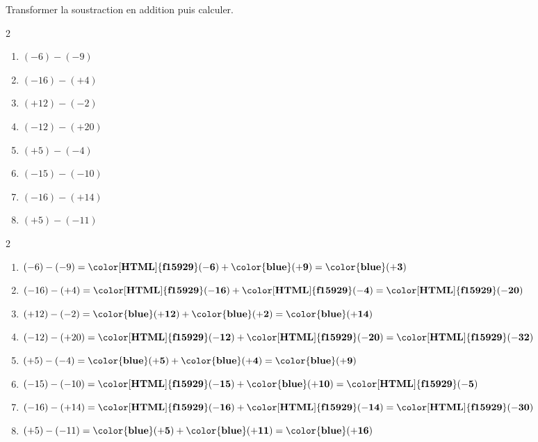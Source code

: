 \begin{exercice*}
    Transformer la soustraction en addition puis calculer.
    \begin{multicols}2
        \begin{enumerate}            
            \item $ (-6) - (-9) $
            \item $ (-16) - (+4) $
            \item $ (+12) - (-2) $
            \item $ (-12) - (+20) $
            \item $ (+5) - (-4) $
            \item $ (-15) - (-10) $
            \item $ (-16) - (+14) $
            \item $ (+5) - (-11) $
        \end{enumerate}
    \end{multicols}
\end{exercice*}
\begin{corrige}
    \phantom{rrr}    
    \begin{multicols}2
        \begin{enumerate}
            \item $ (-6) - (-9) = \mathbf{{\color[HTML]{f15929}(-6)}} + \mathbf{{\color{blue}(+9)}} = \mathbf{{\color{blue}(+3)}} $
            \item $ (-16) - (+4) = \mathbf{{\color[HTML]{f15929}(-16)}} + \mathbf{{\color[HTML]{f15929}(-4)}} = \mathbf{{\color[HTML]{f15929}(-20)}} $
            \item $ (+12) - (-2) = \mathbf{{\color{blue}(+12)}} + \mathbf{{\color{blue}(+2)}} = \mathbf{{\color{blue}(+14)}} $
            \item $ (-12) - (+20) = \mathbf{{\color[HTML]{f15929}(-12)}} + \mathbf{{\color[HTML]{f15929}(-20)}} = \mathbf{{\color[HTML]{f15929}(-32)}} $
            \item $ (+5) - (-4) = \mathbf{{\color{blue}(+5)}} + \mathbf{{\color{blue}(+4)}} = \mathbf{{\color{blue}(+9)}} $
            \item $ (-15) - (-10) = \mathbf{{\color[HTML]{f15929}(-15)}} + \mathbf{{\color{blue}(+10)}} = \mathbf{{\color[HTML]{f15929}(-5)}} $
            \item $ (-16) - (+14) = \mathbf{{\color[HTML]{f15929}(-16)}} + \mathbf{{\color[HTML]{f15929}(-14)}} = \mathbf{{\color[HTML]{f15929}(-30)}} $
            \item $ (+5) - (-11) = \mathbf{{\color{blue}(+5)}} + \mathbf{{\color{blue}(+11)}} = \mathbf{{\color{blue}(+16)}} $
        \end{enumerate}
    \end{multicols}
\end{corrige}